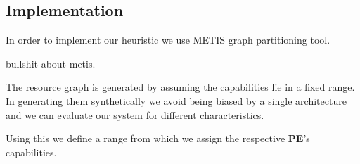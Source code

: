 \subsection{Implementation}
\label{sec:imple}

In order to implement our heuristic we use METIS \cite{} graph
partitioning tool.

bullshit about metis.

The resource graph is generated
by assuming the capabilities lie in a fixed range. In generating
them synthetically we avoid being biased by a single architecture and
we can evaluate our system for different characteristics.

Using this we define a range from which we assign the respective
\textbf{PE}'s capabilities.
